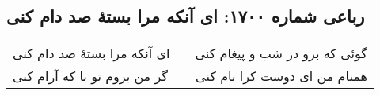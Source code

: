 \begin{center}
\section*{رباعی شماره ۱۷۰۰: ای آنکه مرا بستهٔ صد دام کنی}
\label{sec:1700}
\begin{longtable}{l p{0.5cm} r}
ای آنکه مرا بستهٔ صد دام کنی
&&
گوئی که برو در شب و پیغام کنی
\\
گر من بروم تو با که آرام کنی
&&
همنام من ای دوست کرا نام کنی
\\
\end{longtable}
\end{center}
